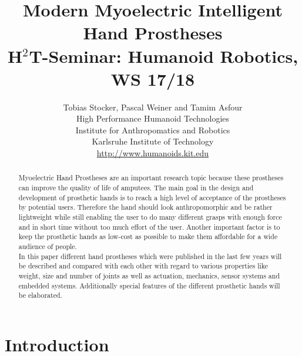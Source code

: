 \documentclass[a4paper, 10pt, conference]{ieeeconf}      %
\title{\bf {\LARGE Modern Myoelectric Intelligent Hand Prostheses} \\ 
{\normalsize H$^2$T-Seminar: Humanoid Robotics, WS 17/18}}
\author{Tobias Stocker, Pascal Weiner and Tamim Asfour \\ High Performance Humanoid Technologies \\ Institute for Anthropomatics and Robotics \\ Karlsruhe Institute of Technology \\
\url{http://www.humanoids.kit.edu}}
\begin{document}
\maketitle
\thispagestyle{empty}
\pagestyle{empty}
%
\begin{abstract}
Myoelectric Hand Prostheses are an important research topic because these prostheses can improve the quality of life of amputees. The main goal in the design and development of prosthetic hands is to reach a high level of acceptance of the prostheses by potential users. Therefore the hand should look anthropomorphic and be rather lightweight while still enabling the user to do many different grasps with enough force and in short time without too much effort of the user. Another important factor is to keep the prosthetic hands as low-cost as possible to make them affordable for a wide audience of people.\\
In this paper different hand prostheses which were published in the last few years will be described and compared with each other with regard to various properties like weight, size and number of joints as well as actuation, mechanics, sensor systems and embedded systems. Additionally special features of the different prosthetic hands will be elaborated.
\end{abstract}

\section{Introduction}
\end{document}
